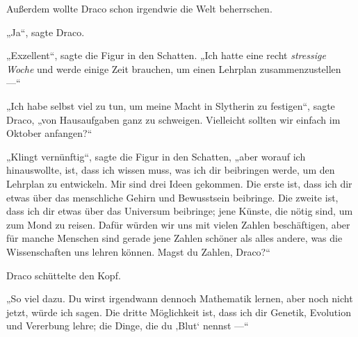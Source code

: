 Außerdem wollte Draco schon irgendwie die Welt beherrschen.

„Ja“, sagte Draco.

„Exzellent“, sagte die Figur in den Schatten.
„Ich hatte eine recht \emph{stressige Woche} und werde einige Zeit brauchen, um einen Lehrplan zusammenzustellen —“

„Ich habe selbst viel zu tun, um meine Macht in Slytherin zu festigen“, sagte Draco, „von Hausaufgaben ganz zu schweigen. Vielleicht sollten wir einfach im Oktober anfangen?“

„Klingt vernünftig“, sagte die Figur in den Schatten, „aber worauf ich hinauswollte, ist, dass ich wissen muss, was ich dir beibringen werde, um den Lehrplan zu entwickeln. Mir sind drei Ideen gekommen. Die erste ist, dass ich dir etwas über das menschliche Gehirn und Bewusstsein beibringe. Die zweite ist, dass ich dir etwas über das Universum beibringe; jene Künste, die nötig sind, um zum Mond zu reisen. Dafür würden wir uns mit vielen Zahlen beschäftigen, aber für manche Menschen sind gerade jene Zahlen schöner als alles andere, was die Wissenschaften uns lehren können. Magst du Zahlen, Draco?“

Draco schüttelte den Kopf.

„So viel dazu. Du wirst irgendwann dennoch Mathematik lernen, aber noch nicht jetzt, würde ich sagen. Die dritte Möglichkeit ist, dass ich dir Genetik, Evolution und Vererbung lehre; die Dinge, die du ‚Blut‘ nennst —“


